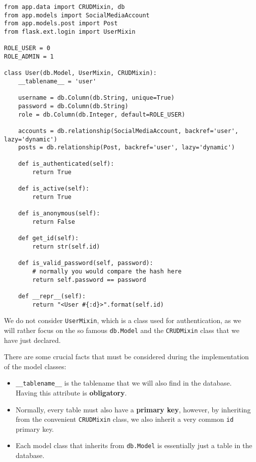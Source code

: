 \documentclass[../main/main.tex]{subfiles}
\begin{document}
\begin{lstlisting}[caption=app/models/user.py, label=lst:user.py]
from app.data import CRUDMixin, db
from app.models import SocialMediaAccount
from app.models.post import Post
from flask.ext.login import UserMixin

ROLE_USER = 0
ROLE_ADMIN = 1

class User(db.Model, UserMixin, CRUDMixin):
    __tablename__ = 'user'

    username = db.Column(db.String, unique=True)
    password = db.Column(db.String)
    role = db.Column(db.Integer, default=ROLE_USER)

    accounts = db.relationship(SocialMediaAccount, backref='user', lazy='dynamic')
    posts = db.relationship(Post, backref='user', lazy='dynamic')

    def is_authenticated(self):
        return True

    def is_active(self):
        return True

    def is_anonymous(self):
        return False

    def get_id(self):
        return str(self.id)

    def is_valid_password(self, password):
        # normally you would compare the hash here
        return self.password == password

    def __repr__(self):
        return "<User #{:d}>".format(self.id)
\end{lstlisting}

We do not consider \lstinline|UserMixin|, which is a class used for
authentication, as we will rather focus on the so famous
\lstinline|db.Model| and the \lstinline|CRUDMixin| class that we have
just declared.

There are some crucial facts that must be considered during the
implementation of the model classes:

\begin{itemize}
  \item \lstinline|__tablename__| is the tablename that we will also
    find in the database. Having this attribute is
    \textbf{obligatory}. 
  \item Normally, every table must also have a \textbf{primary key}, however,
    by inheriting from the convenient \lstinline|CRUDMixin| class, we
    also inherit a very common \lstinline|id| primary key. 
  \item Each model class that inherits from \lstinline|db.Model|
    is essentially just a table in the database. 
\end{itemize}
\end{document}
